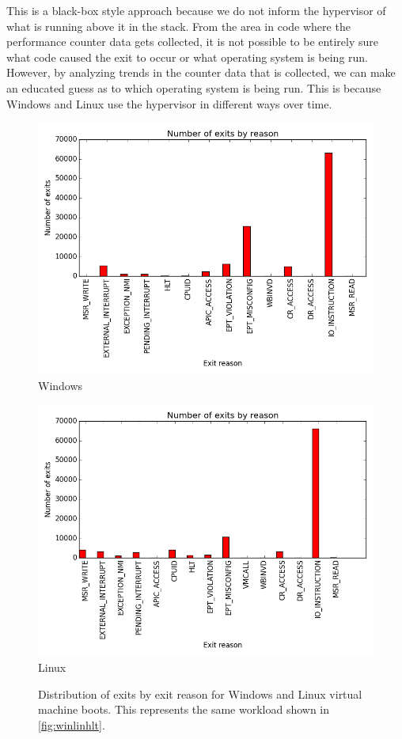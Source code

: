 \documentclass[notitlepage]{article}
\begin{document}
This is a black-box style approach because we do not inform the hypervisor of
what is running above it in the stack. From the area in code where the
performance counter data gets collected, it is not possible to be entirely sure
what code caused the exit to occur or what operating system is being run.
However, by analyzing trends in the counter data that is collected, we can make
an educated guess as to which operating system is being run. This is because
Windows and Linux use the hypervisor in different ways over time.

\begin{figure}[htpb!]
    \centering
    \begin{minipage}{.5\textwidth}
        \centering
        \includegraphics[width=1\textwidth]{dist_windows.png}
        Windows
    \end{minipage}%
    \begin{minipage}{0.5\textwidth}
        \centering
        \includegraphics[width=1\textwidth]{dist_linux.png}
        Linux
    \end{minipage}
    \caption{Distribution of exits by exit reason for Windows and Linux virtual
        machine boots. This represents the same workload shown in
    \ref{fig:winlinhlt}.}
    \label{fig:barplots}
\end{figure}
\end{document}
